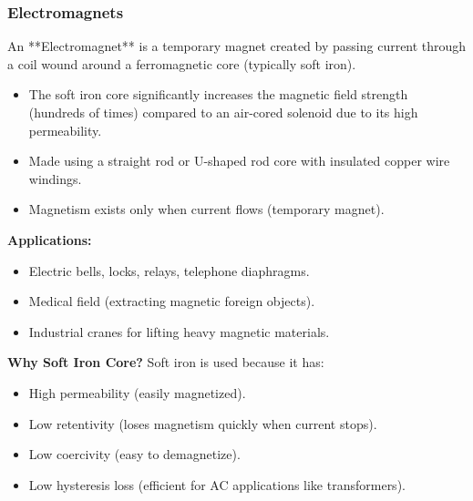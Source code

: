 \begin{frame}[t]
    \frametitle{\textcolor{deepnavy}{\textbf{Electromagnets}}}
    \renewcommand{\familydefault}{\rmdefault}
    \small

      \item<+-> An **Electromagnet** is a temporary magnet created by passing current through a coil wound around a ferromagnetic core (typically soft iron).
        \begin{itemize}[<+->]
              \item The soft iron core significantly increases the magnetic field strength (hundreds of times) compared to an air-cored solenoid due to its high permeability.
              \item Made using a straight rod or U-shaped rod core with insulated copper wire windings.
              \item Magnetism exists only when current flows (temporary magnet).
        \end{itemize} %

      \item<+-> \textbf{Applications:}
        \begin{itemize}[<+->]
              \item Electric bells, locks, relays, telephone diaphragms.
              \item Medical field (extracting magnetic foreign objects).
              \item Industrial cranes for lifting heavy magnetic materials.
        \end{itemize}

    \item<+-> \textbf{Why Soft Iron Core?} Soft iron is used because it has:
        \begin{itemize}[<+->]
            \item High permeability (easily magnetized).
              \item Low retentivity (loses magnetism quickly when current stops).
              \item Low coercivity (easy to demagnetize).
              \item Low hysteresis loss (efficient for AC applications like transformers).
        \end{itemize}
\end{frame}

